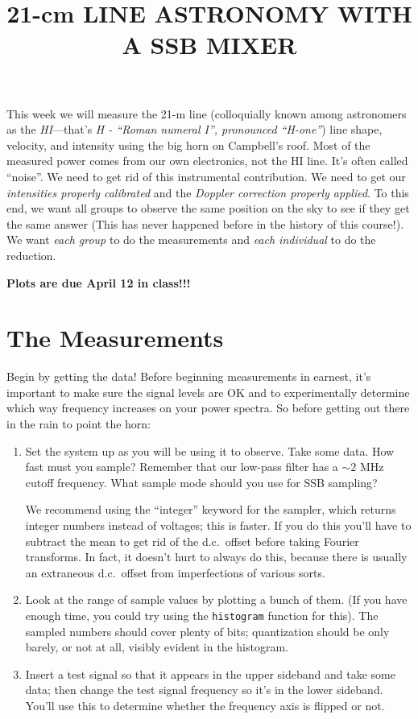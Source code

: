 \documentclass[11pt,preprint]{aastex}
\begin{document}
\title {21-cm LINE ASTRONOMY WITH A SSB MIXER}

This week we will measure the 21-m line (colloquially known among
astronomers as the {\it HI}---that's {\it H - ``Roman numeral I'',
pronounced ``H-one''}) line shape, velocity, and intensity using the big
horn on Campbell's roof.  Most of the measured power comes from our own
electronics, not the HI line.  It's often called ``noise''.  We need to
get rid of this instrumental contribution.  We need to get our {\it
intensities properly calibrated} and the {\it Doppler correction
properly applied}.  To this end, we want all groups to observe the same
position on the sky to see if they get the same answer (This has never
happened before in the history of this course!).  We want {\it each
group} to do the measurements and {\it each individual} to do the
reduction.

{\bf Plots are due April 12 in class!!!}

\section{The Measurements}

Begin by getting the data!  Before beginning measurements in earnest,
it's important to make sure the signal levels are OK and to
experimentally determine which way frequency increases on your power
spectra. So before getting out there in the rain to point the horn:
\begin{enumerate}

\item Set the system up as you will be using it to observe.  Take some
data.  How fast must you sample? Remember that our low-pass filter has a
$\sim 2$ MHz cutoff frequency.  What sample mode should you use for SSB
sampling? 

We recommend using the ``integer'' keyword for the sampler, which
returns integer numbers instead of voltages; this is faster. If you do
this you'll have to subtract the mean to get rid of the d.c.\ offset
before taking Fourier transforms. In fact, it doesn't hurt to always do
this, because there is usually an extraneous d.c.\ offset from
imperfections of various sorts. 

\item Look at the range of sample values by plotting a bunch of them. (If
  you have enough time, you could try using the \verb$histogram$ function
  for this).  The sampled numbers should cover plenty of bits; quantization
  should be only barely, or not at all, visibly evident in the histogram.

\item Insert a test signal so that it appears in the upper sideband and
take some data; then change the test signal frequency so it's in the
lower sideband.  You'll use this to determine whether the frequency axis
is flipped or not.

\end{enumerate}
\end{document}
